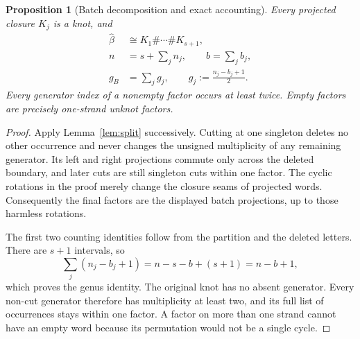 \documentclass[11pt,letterpaper]{article}
\newtheorem{proposition}[theorem]{Proposition}
\theoremstyle{definition}
\newcommand{\cl}[1]{\widehat{#1}}
\begin{document}
\begin{proposition}[Batch decomposition and exact accounting]
\label{prop:batch}
Every projected closure $K_j$ is a knot, and
\begin{align}
 \cl\beta&\cong K_1\#\cdots\# K_{s+1},\label{eq:sum}\\
 n&=s+\sum_j n_j,\qquad b=\sum_j b_j,\label{eq:sizeaccount}\\
 g_B&=\sum_j g_j,\qquad g_j:=\frac{n_j-b_j+1}{2}.\label{eq:genusaccount}
\end{align}
Every generator index of a nonempty factor occurs at least twice. Empty factors are precisely one-strand unknot factors.
\end{proposition}
\begin{proof}
Apply Lemma~\ref{lem:split} successively. Cutting at one singleton deletes no other occurrence and never changes the unsigned multiplicity of any remaining generator. Its left and right projections commute only across the deleted boundary, and later cuts are still singleton cuts within one factor. The cyclic rotations in the proof merely change the closure seams of projected words. Consequently the final factors are the displayed batch projections, up to those harmless rotations.

The first two counting identities follow from the partition and the deleted letters. There are $s+1$ intervals, so
\[
 \sum_j (n_j-b_j+1)=n-s-b+(s+1)=n-b+1,
\]
which proves the genus identity. The original knot has no absent generator. Every non-cut generator therefore has multiplicity at least two, and its full list of occurrences stays within one factor. A factor on more than one strand cannot have an empty word because its permutation would not be a single cycle.
\end{proof}
\end{document}
